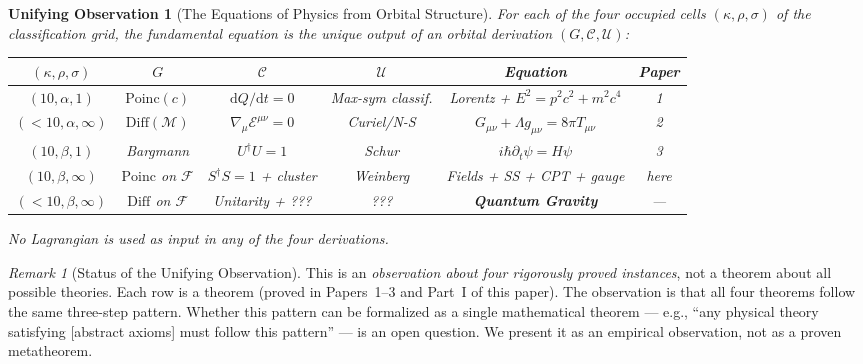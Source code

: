 \documentclass[12pt]{article}
\theoremstyle{plain}
\newtheorem*{observation}{Unifying Observation}
\theoremstyle{definition}
\theoremstyle{remark}
\newtheorem{remark}[theorem]{Remark}
\newcommand{\Poinc}{\mathrm{Poinc}}
\newcommand{\Diff}{\mathrm{Diff}}
\newcommand{\dd}{\mathrm{d}}
\begin{document}
\begin{observation}[The Equations of Physics from Orbital Structure]\label{thm:meta}
For each of the four occupied cells $(\kappa, \rho, \sigma)$ of the classification grid, the fundamental equation is the unique output of an orbital derivation $(G, \mathcal{C}, \mathcal{U})$:

\begin{center}\footnotesize
\begin{tabular}{cccccc}\toprule
$(\kappa, \rho, \sigma)$ & $G$ & $\mathcal{C}$ & $\mathcal{U}$ & \textbf{Equation} & \textbf{Paper} \\\midrule
$(10, \alpha, 1)$ & $\Poinc(c)$ & $\dd Q/\dd t = 0$ & Max-sym classif. & Lorentz + $E^2\!=\!p^2c^2\!+\!m^2c^4$ & 1 \\[2pt]
$(<\!10, \alpha, \infty)$ & $\Diff(\mathcal{M})$ & $\nabla_\mu\mathcal{E}^{\mu\nu}\!=\!0$ & Curiel/N-S & $G_{\mu\nu}\!+\!\Lambda g_{\mu\nu}\!=\!8\pi T_{\mu\nu}$ & 2 \\[2pt]
$(10, \beta, 1)$ & Bargmann & $U^\dagger U\!=\!1$ & Schur & $i\hbar\partial_t\psi\!=\!H\psi$ & 3 \\[2pt]
$(10, \beta, \infty)$ & $\Poinc$ on $\mathcal{F}$ & $S^\dagger S\!=\!1$ + cluster & Weinberg & Fields + SS + CPT + gauge & here \\[2pt]
$(<\!10, \beta, \infty)$ & $\Diff$ on $\mathcal{F}$ & Unitarity + ??? & ??? & \textbf{Quantum Gravity} & --- \\
\bottomrule
\end{tabular}
\end{center}

No Lagrangian is used as input in any of the four derivations.
\end{observation}

\begin{remark}[Status of the Unifying Observation]
This is an \emph{observation about four rigorously proved instances}, not a theorem about all possible theories. Each row is a theorem (proved in Papers~1--3 and Part~I of this paper). The observation is that all four theorems follow the same three-step pattern. Whether this pattern can be formalized as a single mathematical theorem --- e.g., ``any physical theory satisfying [abstract axioms] must follow this pattern'' --- is an open question. We present it as an empirical observation, not as a proven metatheorem.
\end{remark}


\end{document}
